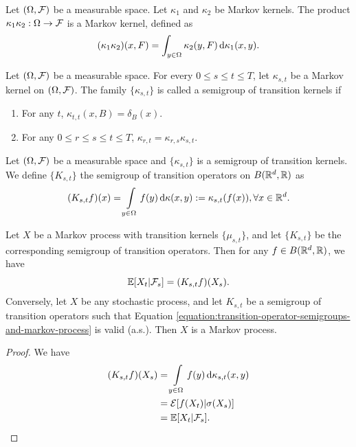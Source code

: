 \begin{definition}
 Let $(\Omega, \mathcal{F})$ be a measurable space. Let $\kappa_1$ and $\kappa_2$ be Markov kernels. The product $\kappa_1\kappa_2 : \Omega \to \mathcal{F}$ is a Markov kernel, defined as
 \begin{equation}
  (\kappa_1\kappa_2)(x,F) = \int_{y\in\Omega}\kappa_2(y,F)\,\mathrm{d}\kappa_1(x,y).
 \end{equation}
\end{definition}

\begin{definition}
 Let $(\Omega, \mathcal{F})$ be a measurable space. For every $0\le s\le t\le T$, let $\kappa_{s,t}$ be a Markov kernel on $(\Omega, \mathcal{F})$. The family $\{\kappa_{s,t}\}$ is called a semigroup of transition kernels if
 \begin{enumerate}[label=(\roman*), ref=(\roman*)]
  \item For any  $t$, $\kappa_{t,t}(x,B) = \delta_{B}(x)$.
  \item For any $0\le r\le s\le t\le T$, $\kappa_{r,t} = \kappa_{r,s}\kappa_{s,t}$.
 \end{enumerate}
\end{definition}

\begin{definition}
 Let $(\Omega, \mathcal{F})$ be a measurable space and $\{\kappa_{s,t}\}$ is a semigroup of transition kernels. We define $\{K_{s,t}\}$ the semigroup of transition operators on $B(\mathbb{R}^d,\mathbb{R})$ as
 \begin{equation}
  (K_{s,t}f)(x) = \int\limits_{y\in\Omega}f(y)\,\mathrm{d} \kappa(x,y) := \kappa_{s,t}(f(x)), \forall x\in\mathbb{R}^d.
 \end{equation}
\end{definition}

\begin{theorem}
 Let $X$ be a Markov process with transition kernels $\{\mu_{s,t}\}$, and let $\{K_{s,t}\}$ be the corresponding semigroup of transition operators. Then for any $f \in B(\mathbb{R}^d, \mathbb{R})$, we have
 \begin{equation}
  \label{equation:transition-operator-semigroups-and-markov-process}
  \mathbb{E}[X_t | \mathcal{F}_s] = (K_{s,t}f)(X_s).
 \end{equation}
 Conversely, let $X$ be any stochastic process, and let $K_{s,t}$ be a semigroup of transition operators such that Equation \ref{equation:transition-operator-semigroups-and-markov-process} is valid (a.s.). Then $X$ is a Markov process.
\end{theorem}
\begin{proof}
 We have
 \begin{align*}
  (K_{s,t}f)(X_s)
   & = \int\limits_{y\in\Omega}f(y)\,\mathrm{d} \kappa_{s,t}(x,y) \\
   & = \mathcal{E}[f(X_t) | \sigma(X_s)]                         \\
   & = \mathbb{E}[X_t | \mathcal{F}_s].
 \end{align*}
\end{proof}

